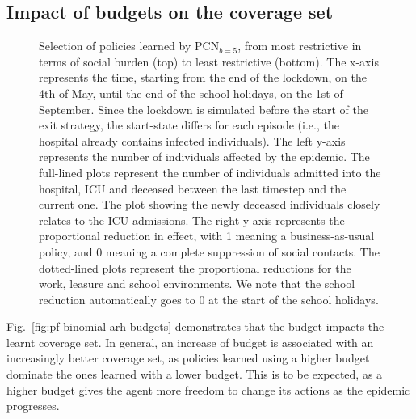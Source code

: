 \documentclass{article}
\newcommand\todo[1]{\textcolor{red}{(TODO: #1)}}
\begin{document}
\subsection{Impact of budgets on the coverage set}

\begin{figure}
    \centering
    
    \caption{Selection of policies learned by $\text{PCN}_{b=5}$, from most restrictive in terms of social burden (top) to least restrictive (bottom). The x-axis represents the time, starting from the end of the lockdown, on the 4th of May, until the end of the school holidays, on the 1st of September. Since the lockdown is simulated before the start of the exit strategy, the start-state differs for each episode (i.e., the hospital already contains infected individuals). The left y-axis represents the number of individuals affected by the epidemic. The full-lined plots represent the number of individuals admitted into the hospital, ICU and deceased between the last timestep and the current one. The plot showing the newly deceased individuals closely relates to the ICU admissions. The right y-axis represents the proportional reduction in effect, with 1 meaning a business-as-usual policy, and 0 meaning a complete suppression of social contacts. The dotted-lined plots represent the proportional reductions for the work, leasure and school environments. We note that the school reduction automatically goes to 0 at the start of the school holidays.
    }
    \label{fig:policy-execution}
\end{figure}

Fig.~\ref{fig:pf-binomial-arh-budgets} demonstrates that the budget impacts the learnt coverage set. In general, an increase of budget is associated with an increasingly better coverage set, as policies learned using a higher budget dominate the ones learned with a lower budget. This is to be expected, as a higher budget gives the agent more freedom to change its actions as the epidemic progresses. %
\end{document}

